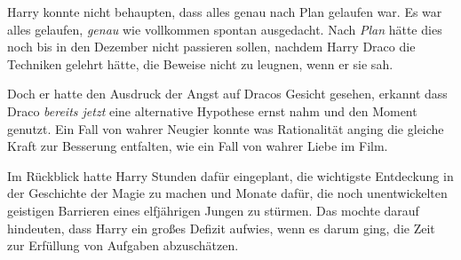 Harry konnte nicht behaupten, dass alles genau nach Plan gelaufen war. Es war alles gelaufen, \emph{genau} wie vollkommen spontan ausgedacht. Nach \emph{Plan} hätte dies noch bis in den Dezember nicht passieren sollen, nachdem Harry Draco die Techniken gelehrt hätte, die Beweise nicht zu leugnen, wenn er sie sah.

Doch er hatte den Ausdruck der Angst auf Dracos Gesicht gesehen, erkannt dass Draco \emph{bereits jetzt} eine alternative Hypothese ernst nahm und den Moment genutzt. Ein Fall von wahrer Neugier konnte was Rationalität anging die gleiche Kraft zur Besserung entfalten, wie ein Fall von wahrer Liebe im Film.

Im Rückblick hatte Harry Stunden dafür eingeplant, die wichtigste Entdeckung in der Geschichte der Magie zu machen und Monate dafür, die noch unentwickelten geistigen Barrieren eines elfjährigen Jungen zu stürmen. Das mochte darauf hindeuten, dass Harry ein großes Defizit aufwies, wenn es darum ging, die Zeit zur Erfüllung von Aufgaben abzuschätzen.

